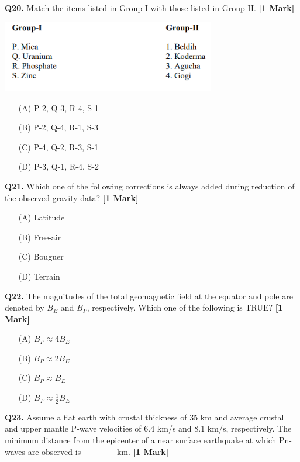 \documentclass[11pt]{article}
\newcommand{\questiona}[2]{
    \noindent\textbf{Q#2.} #1 \hfill \textbf{[1 Mark]}
}
\begin{document}
\questiona{Match the items listed in Group-I with those listed in Group-II.}{20}
\begin{center}
\includegraphics[width=0.7\textwidth]{figures/20.png}
\end{center}
\begin{enumerate}
    \item[(A)] P-2, Q-3, R-4, S-1
    \item[(B)] P-2, Q-4, R-1, S-3
    \item[(C)] P-4, Q-2, R-3, S-1
    \item[(D)] P-3, Q-1, R-4, S-2
\end{enumerate}
\vspace{0.5cm}

\questiona{Which one of the following corrections is always added during reduction of the observed gravity data?}{21}
\begin{enumerate}
    \item[(A)] Latitude
    \item[(B)] Free-air
    \item[(C)] Bouguer
    \item[(D)] Terrain
\end{enumerate}
\vspace{0.5cm}

\questiona{The magnitudes of the total geomagnetic field at the equator and pole are denoted by \(B_E\) and \(B_P\), respectively. Which one of the following is TRUE?}{22}
\begin{enumerate}
    \item[(A)] \(B_P \approx 4 B_E\)
    \item[(B)] \(B_P \approx 2 B_E\)
    \item[(C)] \(B_P \approx B_E\)
    \item[(D)] \(B_P \approx \frac{1}{2} B_E\)
\end{enumerate}
\vspace{0.5cm}

\questiona{Assume a flat earth with crustal thickness of 35 km and average crustal and upper mantle P-wave velocities of 6.4 km/s and 8.1 km/s, respectively. The minimum distance from the epicenter of a near surface earthquake at which Pn-waves are observed is \_\_\_\_\_ km.}{23}
\vspace{0.5cm}
\end{document}
